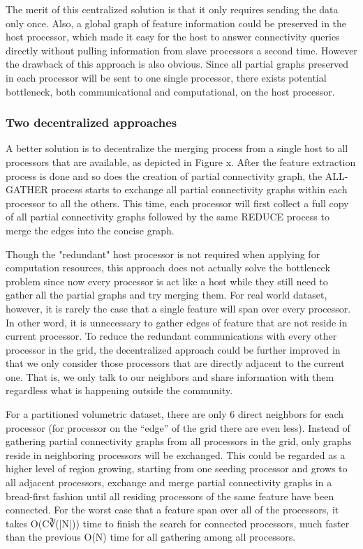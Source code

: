 \documentclass[10pt, conference, compsocconf]{IEEEtran}
\begin{document}
The merit of this centralized solution is that it only requires sending the data only once. Also, a global graph of feature information could be preserved in the host processor, which made it easy for the host to answer connectivity queries directly without pulling information from slave processors a second time. However the drawback of this approach is also obvious. Since all partial graphs preserved in each processor will be sent to one single processor, there exists potential bottleneck, both communicational and computational, on the host processor.

\subsubsection{Two decentralized approaches}
A better solution is to decentralize the merging process from a single host to all processors that are available, as depicted in Figure x. After the feature extraction process is done and so does the creation of partial connectivity graph, the ALL-GATHER process starts to exchange all partial connectivity graphs within each processor to all the others. This time, each processor will first collect a full copy of all partial connectivity graphs followed by the same REDUCE process to merge the edges into the concise graph. 

Though the "redundant" host processor is not required when applying for computation resources, this approach does not actually solve the bottleneck problem since now every processor is act like a host while they still need to gather all the partial graphs and try merging them. For real world dataset, however, it is rarely the case that a single feature will span over every processor. In other word, it is unnecessary to gather edges of feature that are not reside in current processor. To reduce the redundant communications with every other processor in the grid, the decentralized approach could be further improved in that we only consider those processors that are directly adjacent to the current one. That is, we only talk to our neighbors and share information with them regardless what is happening outside the community. 

For a partitioned volumetric dataset, there are only 6 direct neighbors for each processor (for processor on the “edge” of the grid there are even less). Instead of gathering partial connectivity graphs from all processors in the grid, only graphs reside in neighboring processors will be exchanged. This could be regarded as a higher level of region growing, starting from one seeding processor and grows to all adjacent processors, exchange and merge partial connectivity graphs in a bread-first fashion until all residing processors of the same feature have been connected. For the worst case that a feature span over all of the processors, it takes O(C∛(|N|)) time to finish the search for connected processors, much faster than the previous O(N) time for all gathering among all processors.
\end{document}

